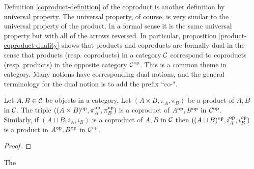 \begin{rem} Definition \ref{coproduct-definition} of the coproduct is another definition by universal property. The universal property, of course, is very similar to the universal property of the product. In a formal sense it is the same universal property but with all of the arrows reversed. In particular, proposition \ref{product-coproduct-duality} shows that products and coproducts are formally dual in the sense that products (resp. coproducts) in a category ${\mathcal C}$ correspond to coproducts (resp. products) in the opposite category ${\mathcal C}^{\operatorname{op}}$. This is a common theme in category. Many notions have corresponding dual notions, and the general terminology for the dual notion is to add the prefix ``co-".
\end{rem}

\begin{prop}\label{product-coproduct-duality} Let $A,B\in {\mathcal C}$ be objects in a category. Let $(A\times B,\pi_A,\pi_B)$ be a product of $A,B$ in ${\mathcal C}$. The triple $((A\times B)^{\operatorname{op}},\pi_A^{\operatorname{op}},\pi_B^{\operatorname{op}})$ is a coproduct of $A^{\operatorname{op}},B^{\operatorname{op}}$ in ${\mathcal C}^{\operatorname{op}}$. Similarly, if $(A\sqcup B,i_A,i_B)$ is a coproduct of $A,B$ in ${\mathcal C}$ then $((A\sqcup B)^{\operatorname{op}},i_A^{\operatorname{op}},i_B^{\operatorname{op}})$ is a product in $A^{\operatorname{op}},B^{\operatorname{op}}$ in ${\mathcal C}^{\operatorname{op}}$.
\end{prop}
\begin{proof}
\end{proof}

\begin{rem}
\end{rem}

\begin{prop} The 
\end{prop}




